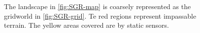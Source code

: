 \begin{figure}
{}


\caption{The landscape in \ref{fig:SGR-map} is coarsely represented as the gridworld in \ref{fig:SGR-grid}. Te red regions represent impassable terrain. The yellow areas covered are by static sensors.}
\label{fig:casestudy}
\end{figure}

